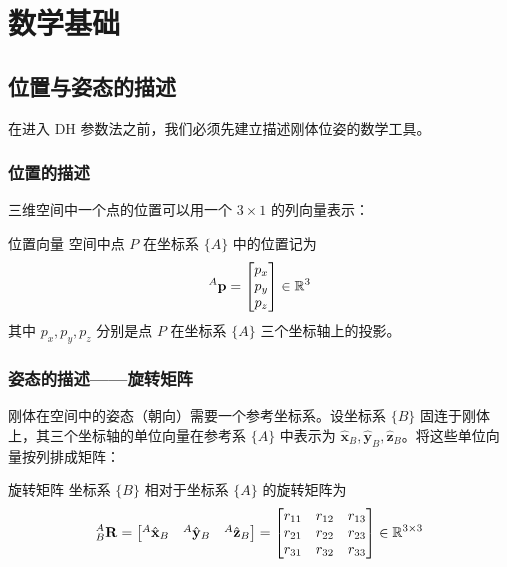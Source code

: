 \chapter{数学基础}

\section{位置与姿态的描述}

在进入 DH 参数法之前，我们必须先建立描述刚体位姿的数学工具。

\subsection{位置的描述}

三维空间中一个点的位置可以用一个 $3 \times 1$ 的列向量表示：

\begin{mydefinition}{位置向量}
	空间中点 $P$ 在坐标系 $\{A\}$ 中的位置记为
	\[
	{}^{A}\mathbf{p} = \begin{bmatrix} p_x \\ p_y \\ p_z \end{bmatrix} \in \mathbb{R}^3
	\]
	其中 $p_x, p_y, p_z$ 分别是点 $P$ 在坐标系 $\{A\}$ 三个坐标轴上的投影。
\end{mydefinition}

\subsection{姿态的描述——旋转矩阵}

刚体在空间中的姿态（朝向）需要一个参考坐标系。设坐标系 $\{B\}$ 固连于刚体上，其三个坐标轴的单位向量在参考系 $\{A\}$ 中表示为 $\hat{\mathbf{x}}_B, \hat{\mathbf{y}}_B, \hat{\mathbf{z}}_B$。将这些单位向量按列排成矩阵：

\begin{mydefinition}{旋转矩阵}
	坐标系 $\{B\}$ 相对于坐标系 $\{A\}$ 的旋转矩阵为
	\[
	{}^{A}_{B}\mathbf{R} = \begin{bmatrix}
		{}^{A}\hat{\mathbf{x}}_B & {}^{A}\hat{\mathbf{y}}_B & {}^{A}\hat{\mathbf{z}}_B
	\end{bmatrix} = \begin{bmatrix}
		r_{11} & r_{12} & r_{13} \\
		r_{21} & r_{22} & r_{23} \\
		r_{31} & r_{32} & r_{33}
	\end{bmatrix} \in \mathbb{R}^{3 \times 3}
	\]
\end{mydefinition}

